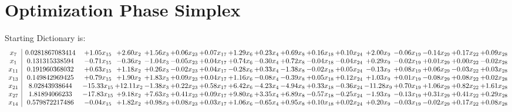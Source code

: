 \documentclass[9pt]{article}
\begin{document}
\section{Optimization Phase Simplex}
Starting Dictionary is:
\[\begin{array}{c| c c@{\hskip 2pt} c@{\hskip 2pt} c@{\hskip 2pt} c@{\hskip 2pt} c@{\hskip 2pt} c@{\hskip 2pt} c@{\hskip 2pt} c@{\hskip 2pt} c@{\hskip 2pt} c@{\hskip 2pt} c@{\hskip 2pt} c@{\hskip 2pt} c@{\hskip 2pt} c@{\hskip 2pt} c@{\hskip 2pt} }
 x_{7}   &  0.0281867083414 & +  1.05 x_{15} & +  2.60 x_{2} & +  1.56 x_{3} & +  0.06 x_{23} & +  0.07 x_{17} & +  1.29 x_{6} & +  0.23 x_{4} & +  0.69 x_{8} & +  0.16 x_{18} & +  0.10 x_{24} & +  2.00 x_{9} & -0.06 x_{19} & -0.14 x_{29} & +  0.17 x_{22} & +  0.09 x_{28}\\
 x_{1}   &  0.131315338594 & -0.71 x_{15} & -0.36 x_{2} & -1.04 x_{3} & -0.05 x_{23} & +  0.04 x_{17} & +  0.74 x_{6} & -0.30 x_{4} & +  0.72 x_{8} & -0.04 x_{18} & -0.04 x_{24} & +  0.29 x_{9} & -0.02 x_{19} & +  0.01 x_{29} & +  0.00 x_{22} & -0.02 x_{28}\\
 x_{11}   &  0.191960368032 & +  0.63 x_{15} & +  1.18 x_{2} & +  0.26 x_{3} & -0.02 x_{23} & +  0.04 x_{17} & -0.28 x_{6} & +  0.33 x_{4} & -1.38 x_{8} & -0.02 x_{18} & +  0.05 x_{24} & -0.13 x_{9} & +  0.08 x_{19} & +  0.06 x_{29} & -0.03 x_{22} & +  0.03 x_{28}\\
 x_{13}   &  0.149842969425 & +  0.79 x_{15} & +  1.90 x_{2} & +  1.83 x_{3} & +  0.09 x_{23} & +  0.04 x_{17} & +  1.16 x_{6} & -0.08 x_{4} & -0.39 x_{8} & +  0.05 x_{18} & +  0.12 x_{24} & +  1.03 x_{9} & +  0.01 x_{19} & -0.08 x_{29} & +  0.08 x_{22} & +  0.02 x_{28}\\
 x_{21}   &  8.02843938644 & -15.33 x_{15} & + 12.11 x_{2} & -1.38 x_{3} & +  0.22 x_{23} & +  0.58 x_{17} & +  6.42 x_{6} & -4.23 x_{4} & -4.94 x_{8} & +  0.33 x_{18} & -0.36 x_{24} & -11.28 x_{9} & +  0.70 x_{19} & +  1.06 x_{29} & +  0.82 x_{22} & +  1.61 x_{28}\\
 x_{27}   &  1.81894066233 & -17.83 x_{15} & +  9.18 x_{2} & +  7.63 x_{3} & +  0.41 x_{23} & +  0.09 x_{17} & +  9.80 x_{6} & +  3.35 x_{4} & +  6.89 x_{8} & -0.57 x_{18} & -0.25 x_{24} & -1.93 x_{9} & -0.13 x_{19} & +  0.31 x_{29} & +  0.41 x_{22} & +  0.29 x_{28}\\
 x_{14}   &  0.579872217486 & -0.04 x_{15} & +  1.82 x_{2} & +  0.98 x_{3} & +  0.08 x_{23} & +  0.03 x_{17} & +  1.06 x_{6} & -0.65 x_{4} & +  0.95 x_{8} & +  0.10 x_{18} & +  0.02 x_{24} & +  0.20 x_{9} & -0.03 x_{19} & -0.02 x_{29} & +  0.17 x_{22} & +  0.08 x_{28}\\

\end{array}\]
\end{document}
